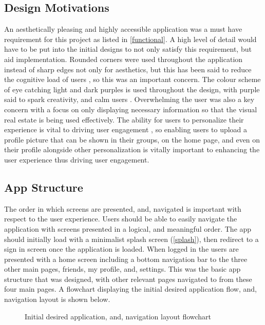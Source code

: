 \subsection*{Design Motivations}
An aesthetically pleasing and highly accessible application was a must have requirement for this project as listed in \ref{functional}. A high level of detail would have to be put into the initial designs to not only satisfy this requirement, but aid implementation. Rounded corners were used throughout the application instead of sharp edges not only for aesthetics, but this has been said to reduce the cognitive load of users \cite{roundedCorners}, so this was an important concern. The colour scheme of eye catching light and dark purples is used throughout the design, with purple said to spark creativity, and calm users \cite{purplePsych}. Overwhelming the user was also a key concern with a focus on only displaying necessary information so that the visual real estate is being used effectively. The ability for users to personalize their experience is vital to driving user engagement \cite{customUserEng}, so enabling users to upload a profile picture that can be shown in their groups, on the home page, and even on their profile alongside other personalization is vitally important to enhancing the user experience thus driving user engagement. 

\subsection*{App Structure}
The order in which screens are presented, and, navigated is important with respect to the user experience. Users should be able to easily navigate the application with screens presented in a logical, and meaningful order. The app should initially load with a minimalist splash screen (\ref{splash}), then redirect to a sign in screen once the application is loaded. When logged in the users are presented with a home screen including a bottom navigation bar to the three other main pages, friends, my profile, and, settings. This was the basic app structure that was designed, with other relevant pages navigated to from these four main pages. A flowchart displaying the initial desired application flow, and, navigation layout is shown below. 

\begin{figure}[!htbp]
    \centering
    \begin{subfigure}[b]{0.6\textwidth}
    \end{subfigure}
    \caption{Initial desired application, and, navigation layout flowchart} 
    \label{fig:layoutFlow}
\end{figure}
\FloatBarrier